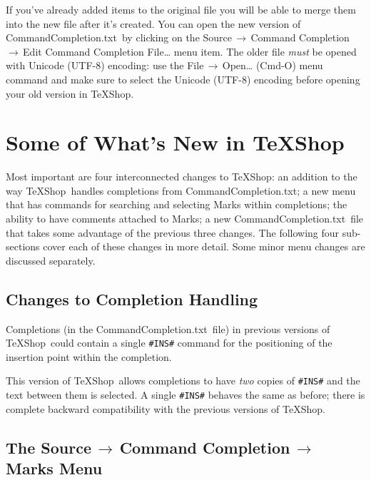 \documentclass[11pt]{article}
\newcommand{\cmdkey}{\textsf{Cmd}}
\newcommand{\mnu}[1]{\textsf{#1}}
\newcommand{\cmd}[1]{\textsf{#1}}
\newcommand{\To}{\,\(\to\)\,}
\newcommand{\TS}{\textsf{\TeX Shop}}
\newcommand{\CCT}{\textsf{CommandCompletion.txt}}
\begin{document}
If you've already added items to the original file you will be able to merge them into the new file after it's created. You can open the new version of \CCT\ by clicking on the \mnu{Source}\To\mnu{Command Completion}\To\mnu{Edit Command Completion File\dots} menu item. The older file \emph{must} be opened with Unicode (UTF-8) encoding: use the \mnu{File}\To\mnu{Open\dots} (\cmd{\cmdkey-O}) menu command and make sure to select the \textsf{Unicode (UTF-8)} encoding before opening your old version in \TS.

\section*{Some of What's New in \TS}

Most important are four interconnected changes to \TS: an addition to the way \TS\ handles completions from \CCT; a new menu that has commands for searching and selecting Marks within completions; the ability to have comments attached to Marks; a new \CCT\ file that takes some advantage of the previous three changes. The following four sub-sections cover each of these changes in more detail. Some minor menu changes are discussed separately.

\subsection*{Changes to Completion Handling}

Completions (in the \CCT\ file) in previous versions of \TS\ could contain a single \verb|#INS#| command for the positioning of the insertion point within the completion.

This version of \TS\ allows completions to have \emph{two} copies of \verb|#INS#| and the text between them is selected. A single \verb|#INS#| behaves the same as before; there is complete backward compatibility with the previous versions of \TS.

\subsection*{The \mnu{Source}\To\mnu{Command Completion}\To\mnu{Marks} Menu}
\end{document}
